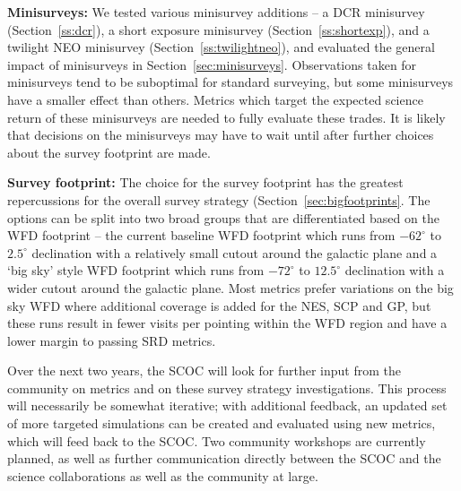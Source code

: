 {\bf Minisurveys:} We tested various minisurvey additions -- a DCR minisurvey (Section~\ref{ss:dcr}), a short exposure minisurvey (Section~\ref{ss:shortexp}), and a twilight NEO minisurvey (Section~\ref{ss:twilightneo}), and evaluated the general impact of minisurveys in Section~\ref{sec:minisurveys}. Observations taken for minisurveys tend to be suboptimal for standard surveying, but some minisurveys have a smaller effect than others. Metrics which target the expected science return of these minisurveys are needed to fully evaluate these trades. It is likely that decisions on the minisurveys may have to wait until after further choices about the survey footprint are made.

{\bf Survey footprint:} The choice for the survey footprint has the greatest repercussions for the overall survey strategy (Section~\ref{sec:bigfootprints}. The options can be split into two broad groups that are differentiated based on the WFD footprint -- the current baseline WFD footprint which runs from $-62^\circ$ to $2.5^\circ$ declination with a relatively small cutout around the galactic plane and a `big sky' style WFD footprint which runs from  $-72^\circ$ to $12.5^\circ$ declination with a wider cutout around the galactic plane. Most metrics prefer variations on the big sky WFD where additional coverage is added for the NES, SCP and GP, but these runs result in fewer visits per pointing within the WFD region and have a lower margin to passing SRD metrics. 

Over the next two years, the SCOC will look for further input from the community on metrics and on these survey strategy investigations. This process will necessarily be somewhat iterative; with additional feedback, an updated set of more targeted simulations can be created and evaluated using new metrics, which will feed back to the SCOC. Two community workshops are currently planned, as well as further communication directly between the SCOC and the science collaborations as well as the community at large. 

